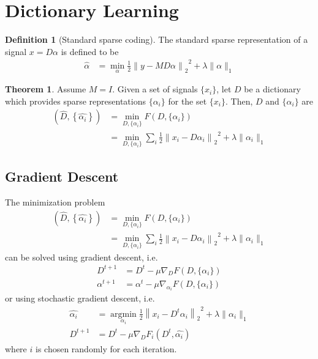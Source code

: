\documentclass[titlepage, fleqn, a4paper, 12pt, twoside]{article}
\theoremstyle{definition}
\newtheorem{definition}{Definition}
\theoremstyle{theorem}
\newtheorem{theorem}{Theorem}
\DeclareMathOperator{\argmin}{\mathrm{argmin}}
\begin{document}
\section{Dictionary Learning}

\begin{definition}[Standard sparse coding]
	The standard sparse representation of a signal $x = D \alpha$ is defined to be
	\begin{align*}
		\hat{\alpha} &= \min\limits_{\alpha} \frac{1}{2} {\left\| y - M D \alpha \right\|_2}^2 + \lambda \|\alpha\|_1
	\end{align*}
\end{definition}

\begin{theorem}
	Assume $M = I$.
	Given a set of signals $\{x_i\}$, let $D$ be a dictionary which provides sparse representations $\{\alpha_i\}$ for the set $\{x_i\}$.
	Then, $D$ and $\{\alpha_i\}$ are
	\begin{align*}
		\left( \hat{D},\left\{ \hat{\alpha_i}\right \} \right) &= \min\limits_{D,\{\alpha_i\}} F\left( D , \{\alpha_i\} \right)\\
		&= \min\limits_{D,\{\alpha_i\}} \sum\limits_{i} \frac{1}{2} {\left\| x_i - D \alpha_i \right\|_2}^2 + \lambda \|\alpha_i\|_1
	\end{align*}
\end{theorem}

\subsection{Gradient Descent}

The minimization problem
\begin{align*}
	\left( \hat{D},\left\{ \hat{\alpha_i}\right \} \right) &= \min\limits_{D,\{\alpha_i\}} F\left( D , \{\alpha_i\} \right)\\
	&= \min\limits_{D,\{\alpha_i\}} \sum\limits_{i} \frac{1}{2} {\left\| x_i - D \alpha_i \right\|_2}^2 + \lambda \|\alpha_i\|_1
\end{align*}
can be solved using gradient descent, i.e.
\begin{align*}
	D^{t + 1} &= D^t - \mu \nabla_D F\left( D , \{\alpha_i\} \right)\\
	\alpha^{t + 1} &= \alpha^t - \mu \nabla_{\alpha_i} F\left( D , \{\alpha_i\} \right)
\end{align*}
or using stochastic gradient descent, i.e.
\begin{align*}
	\hat{\alpha_i} &= \argmin\limits_{\alpha_i} \frac{1}{2} {\left\| x_i - D^t \alpha_i \right\|_2}^2 + \lambda \|\alpha_i\|_1\\
	D^{t + 1} &= D^t - \mu \nabla_D F_i\left( D^t , \hat{\alpha_i} \right)
\end{align*}
where $i$ is chosen randomly for each iteration.
\end{document}
